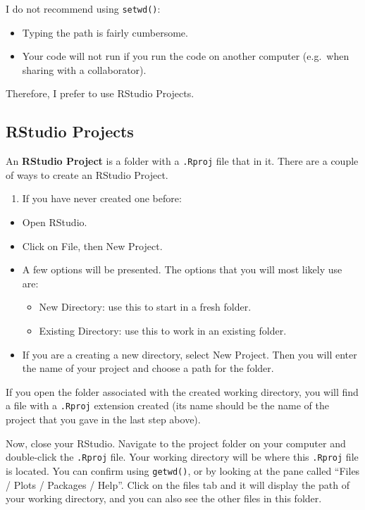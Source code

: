 \documentclass[
]{book}
\providecommand{\tightlist}{%
  \setlength{\itemsep}{0pt}\setlength{\parskip}{0pt}}
\theoremstyle{definition}
\theoremstyle{definition}
\theoremstyle{definition}
\theoremstyle{definition}
\theoremstyle{remark}
\begin{document}
I do not recommend using \texttt{setwd()}:

\begin{itemize}
\tightlist
\item
  Typing the path is fairly cumbersome.
\item
  Your code will not run if you run the code on another computer (e.g.~when sharing with a collaborator).
\end{itemize}

Therefore, I prefer to use RStudio Projects.

\hypertarget{rstudio-projects}{%
\subsection{RStudio Projects}\label{rstudio-projects}}

An \textbf{RStudio Project} is a folder with a \texttt{.Rproj} file that in it. There are a couple of ways to create an RStudio Project.

\begin{enumerate}
\def\labelenumi{\arabic{enumi}.}
\tightlist
\item
  If you have never created one before:
\end{enumerate}

\begin{itemize}
\tightlist
\item
  Open RStudio.
\item
  Click on File, then New Project.
\item
  A few options will be presented. The options that you will most likely use are:

  \begin{itemize}
  \tightlist
  \item
    New Directory: use this to start in a fresh folder.
  \item
    Existing Directory: use this to work in an existing folder.
  \end{itemize}
\item
  If you are a creating a new directory, select New Project. Then you will enter the name of your project and choose a path for the folder.
\end{itemize}

If you open the folder associated with the created working directory, you will find a file with a \texttt{.Rproj} extension created (its name should be the name of the project that you gave in the last step above).

Now, close your RStudio. Navigate to the project folder on your computer and double-click the \texttt{.Rproj} file. Your working directory will be where this \texttt{.Rproj} file is located. You can confirm using \texttt{getwd()}, or by looking at the pane called ``Files / Plots / Packages / Help''. Click on the files tab and it will display the path of your working directory, and you can also see the other files in this folder.
\end{document}
